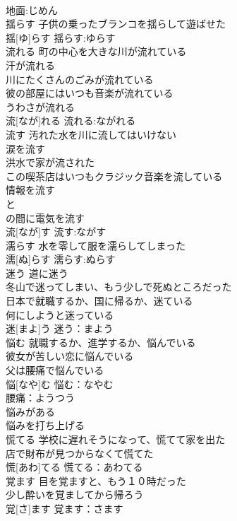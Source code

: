 \documentclass[8pt]{extreport}
\begin{document}
\begin{CJK}{UTF8}{min}
\\	地面:じめん
\\	揺らす	子供の乗ったブランコを揺らして遊ばせた 
\\	揺[ゆ]らす			揺らす:ゆらす
\\	流れる	町の中心を大きな川が流れている 
\\	汗が流れる 
\\	川にたくさんのごみが流れている 
\\	彼の部屋にはいつも音楽が流れている 
\\	うわさが流れる 
\\	流[なが]れる			流れる:ながれる
\\	流す	汚れた水を川に流してはいけない 
\\	涙を流す 
\\	洪水で家が流された 
\\	この喫茶店はいつもクラジック音楽を流している 
\\	情報を流す 
\\	と
\\	の間に電気を流す 
\\	流[なが]す			流す:ながす
\\	濡らす	水を零して服を濡らしてしまった 
\\	濡[ぬ]らす			濡らす:ぬらす
\\	迷う	道に迷う 
\\	冬山で迷ってしまい、もう少しで死ぬところだった 
\\	日本で就職するか、国に帰るか、迷ている 
\\	何にしようと迷っている 
\\	迷[まよ]う			迷う：まよう
\\	悩む	就職するか、進学するか、悩んでいる 
\\	彼女が苦しい恋に悩んでいる 
\\	父は腰痛で悩んでいる 
\\	悩[なや]む			悩む：なやむ
\\	腰痛：ようつう
\\	悩みがある 
\\	悩みを打ち上げる 
\\	慌てる	学校に遅れそうになって、慌てて家を出た 
\\	店で財布が見つからなくて慌てた 
\\	慌[あわ]てる			慌てる：あわてる
\\	覚ます	目を覚ますと、もう１０時だった 
\\	少し酔いを覚ましてから帰ろう 
\\	覚[さ]ます			覚ます：さます

\end{CJK}
\end{document}
